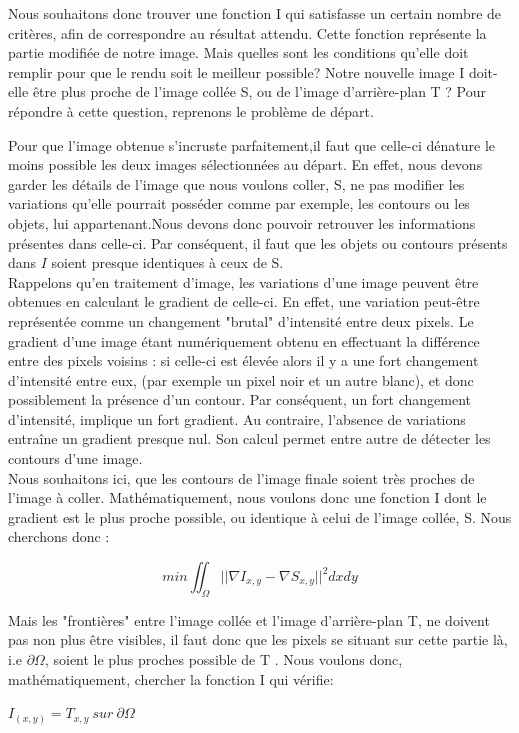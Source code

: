 Nous souhaitons donc trouver une fonction I qui satisfasse un certain nombre de critères, afin de correspondre au résultat attendu.  
Cette fonction représente la partie modifiée de notre image. Mais quelles sont les conditions qu'elle doit remplir pour que le rendu soit le meilleur possible? Notre nouvelle image I doit-elle être plus proche de l'image collée S, ou de l'image d'arrière-plan T ? \newline
Pour répondre à cette question, reprenons le problème de départ. \newline

Pour que l'image obtenue s'incruste parfaitement,il faut que celle-ci dénature le moins possible les deux images sélectionnées au départ. En effet, nous devons garder les détails de l'image que nous voulons coller, S, ne pas modifier les variations qu'elle pourrait posséder comme par exemple, les contours ou les objets, lui appartenant.Nous devons donc pouvoir retrouver les informations présentes dans celle-ci. Par conséquent, il faut que les objets ou contours présents dans $I$ soient presque identiques à ceux de S.\\
Rappelons qu'en traitement d'image, les variations d'une image peuvent être obtenues en calculant le gradient de celle-ci. En effet, une variation peut-être représentée comme un changement "brutal" d'intensité entre deux pixels. Le gradient d'une image étant numériquement obtenu en effectuant la différence entre des pixels voisins : si celle-ci est élevée alors il y a une fort changement d'intensité entre eux, (par exemple un pixel noir et un autre blanc), et donc possiblement la présence d'un contour. Par conséquent, un fort changement d'intensité, implique un fort gradient. Au contraire, l'absence de variations entraîne un gradient presque nul. Son calcul permet entre autre de détecter les contours d'une image.\\
Nous souhaitons ici, que les contours de l'image finale soient très proches de l'image à coller. Mathématiquement, nous voulons donc une fonction I dont le gradient est le plus proche possible, ou identique à celui de l'image collée, S. Nous cherchons donc :
\begin{center}
    $$ min \iint_\Omega || \nabla I_{x,y} - \nabla S_{x,y}||^2 dxdy$$
\end{center} 

Mais les "frontières" entre l'image collée et l'image d'arrière-plan T, ne doivent pas non plus être visibles, il faut donc que les pixels se situant sur cette partie là, i.e $\partial \Omega$, soient le plus proches possible de T .  Nous voulons donc, mathématiquement, chercher la fonction I qui vérifie: 
\begin{center}
    $I_{(x,y)} = T_{x,y} \ sur\ \partial \Omega$
\end{center}

